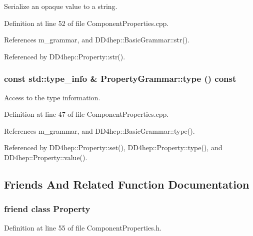 Serialize an opaque value to a string. 

Definition at line 52 of file ComponentProperties.cpp.

References m\_\-grammar, and DD4hep::BasicGrammar::str().

Referenced by DD4hep::Property::str().\hypertarget{class_d_d4hep_1_1_property_grammar_a602f5977dbe746e90b69bc5b6f24f8ee}{
\subsubsection[{type}]{\setlength{\rightskip}{0pt plus 5cm}const std::type\_\-info \& PropertyGrammar::type () const}}
\label{class_d_d4hep_1_1_property_grammar_a602f5977dbe746e90b69bc5b6f24f8ee}


Access to the type information. 

Definition at line 47 of file ComponentProperties.cpp.

References m\_\-grammar, and DD4hep::BasicGrammar::type().

Referenced by DD4hep::Property::set(), DD4hep::Property::type(), and DD4hep::Property::value().

\subsection{Friends And Related Function Documentation}
\hypertarget{class_d_d4hep_1_1_property_grammar_a386f5a9cf65610cb62143865e5637272}{
\subsubsection[{Property}]{\setlength{\rightskip}{0pt plus 5cm}friend class {\bf Property}}}
\label{class_d_d4hep_1_1_property_grammar_a386f5a9cf65610cb62143865e5637272}


Definition at line 55 of file ComponentProperties.h.


